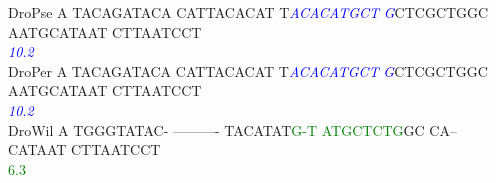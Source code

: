 \documentclass[11pt,twoside,reqno,a4paper]{article}
\begin{document}
{DroPse	A	TACAGATACA	CATTACACAT	T\textit{\textcolor{Blue}{A}}\textit{\textcolor{Blue}{C}}\textit{\textcolor{Blue}{A}}\textit{\textcolor{Blue}{C}}\textit{\textcolor{Blue}{A}}\textit{\textcolor{Blue}{T}}\textit{\textcolor{Blue}{G}}\textit{\textcolor{Blue}{C}}\textit{\textcolor{Blue}{T}}	\textit{\textcolor{Blue}{G}}CTCGCTGGC	AATGCATAAT	CTTAATCCT\\
\hspace*{7\charwidth}\hspace*{1\charwidth}\hspace*{1\charwidth}\hspace*{1\charwidth}\hspace*{22\charwidth}\textit{\textcolor{Blue}{10.2}}\hspace*{1\charwidth}\hspace*{1\charwidth}\hspace*{1\charwidth}\\
DroPer	A	TACAGATACA	CATTACACAT	T\textit{\textcolor{Blue}{A}}\textit{\textcolor{Blue}{C}}\textit{\textcolor{Blue}{A}}\textit{\textcolor{Blue}{C}}\textit{\textcolor{Blue}{A}}\textit{\textcolor{Blue}{T}}\textit{\textcolor{Blue}{G}}\textit{\textcolor{Blue}{C}}\textit{\textcolor{Blue}{T}}	\textit{\textcolor{Blue}{G}}CTCGCTGGC	AATGCATAAT	CTTAATCCT\\
\hspace*{7\charwidth}\hspace*{1\charwidth}\hspace*{1\charwidth}\hspace*{1\charwidth}\hspace*{22\charwidth}\textit{\textcolor{Blue}{10.2}}\hspace*{1\charwidth}\hspace*{1\charwidth}\hspace*{1\charwidth}\\
DroWil	A	TGGGTATAC-	----------	TACATAT\textcolor{Green}{G}\textcolor{Green}{-}\textcolor{Green}{T}	\textcolor{Green}{A}\textcolor{Green}{T}\textcolor{Green}{G}\textcolor{Green}{C}\textcolor{Green}{T}\textcolor{Green}{C}\textcolor{Green}{T}\textcolor{Green}{G}GC	CA--CATAAT	CTTAATCCT\\
\hspace*{7\charwidth}\hspace*{1\charwidth}\hspace*{1\charwidth}\hspace*{1\charwidth}\hspace*{28\charwidth}\textcolor{Green}{6.3}\hspace*{1\charwidth}\hspace*{1\charwidth}\hspace*{1\charwidth}\\
}
\end{document}
